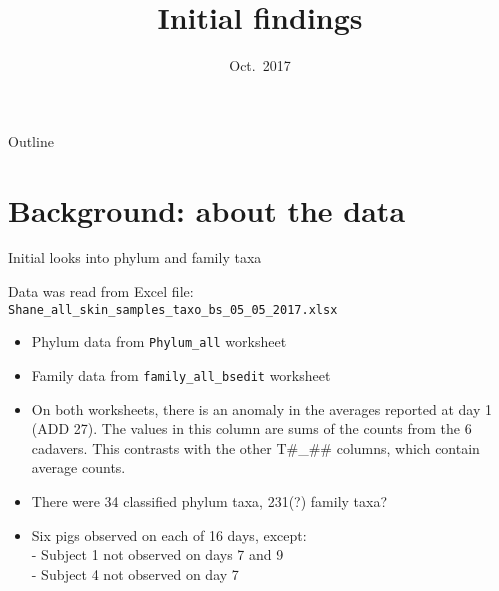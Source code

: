 \documentclass{beamer}
\title[]{Initial findings}
\date{Oct.\ 2017}
\begin{document}
\begin{frame}
  \titlepage
\end{frame}

\begin{frame}{Outline}
  \tableofcontents
\end{frame}








\section[Background]{Background: about the data}


\begin{frame}{Initial looks into phylum and family taxa}

  \noindent Data was read from Excel file:\\
  \texttt{Shane\_all\_skin\_samples\_taxo\_bs\_05\_05\_2017.xlsx}

  \begin{itemize}
    \item Phylum data from \texttt{Phylum\_all} worksheet
    \item Family data from \texttt{family\_all\_bsedit} worksheet
    \item On both worksheets, there is an anomaly in the averages
      reported at day 1 (ADD 27).  The values in this column are sums
      of the counts from the 6 cadavers.  This contrasts with the
      other T\#\_\#\# columns, which contain average counts.
    \item There were 34 classified phylum taxa, 231(?) family taxa?
    \item Six pigs observed on each of 16 days, except:\\
      - Subject 1 not observed on days 7 and 9\\
      - Subject 4 not observed on day 7
  \end{itemize}

\end{frame}
\end{document}
